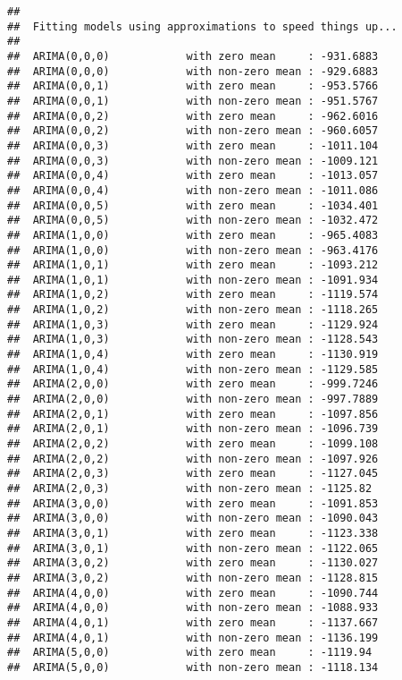 \documentclass[]{article}
\begin{document}
\begin{verbatim}
## 
##  Fitting models using approximations to speed things up...
## 
##  ARIMA(0,0,0)            with zero mean     : -931.6883
##  ARIMA(0,0,0)            with non-zero mean : -929.6883
##  ARIMA(0,0,1)            with zero mean     : -953.5766
##  ARIMA(0,0,1)            with non-zero mean : -951.5767
##  ARIMA(0,0,2)            with zero mean     : -962.6016
##  ARIMA(0,0,2)            with non-zero mean : -960.6057
##  ARIMA(0,0,3)            with zero mean     : -1011.104
##  ARIMA(0,0,3)            with non-zero mean : -1009.121
##  ARIMA(0,0,4)            with zero mean     : -1013.057
##  ARIMA(0,0,4)            with non-zero mean : -1011.086
##  ARIMA(0,0,5)            with zero mean     : -1034.401
##  ARIMA(0,0,5)            with non-zero mean : -1032.472
##  ARIMA(1,0,0)            with zero mean     : -965.4083
##  ARIMA(1,0,0)            with non-zero mean : -963.4176
##  ARIMA(1,0,1)            with zero mean     : -1093.212
##  ARIMA(1,0,1)            with non-zero mean : -1091.934
##  ARIMA(1,0,2)            with zero mean     : -1119.574
##  ARIMA(1,0,2)            with non-zero mean : -1118.265
##  ARIMA(1,0,3)            with zero mean     : -1129.924
##  ARIMA(1,0,3)            with non-zero mean : -1128.543
##  ARIMA(1,0,4)            with zero mean     : -1130.919
##  ARIMA(1,0,4)            with non-zero mean : -1129.585
##  ARIMA(2,0,0)            with zero mean     : -999.7246
##  ARIMA(2,0,0)            with non-zero mean : -997.7889
##  ARIMA(2,0,1)            with zero mean     : -1097.856
##  ARIMA(2,0,1)            with non-zero mean : -1096.739
##  ARIMA(2,0,2)            with zero mean     : -1099.108
##  ARIMA(2,0,2)            with non-zero mean : -1097.926
##  ARIMA(2,0,3)            with zero mean     : -1127.045
##  ARIMA(2,0,3)            with non-zero mean : -1125.82
##  ARIMA(3,0,0)            with zero mean     : -1091.853
##  ARIMA(3,0,0)            with non-zero mean : -1090.043
##  ARIMA(3,0,1)            with zero mean     : -1123.338
##  ARIMA(3,0,1)            with non-zero mean : -1122.065
##  ARIMA(3,0,2)            with zero mean     : -1130.027
##  ARIMA(3,0,2)            with non-zero mean : -1128.815
##  ARIMA(4,0,0)            with zero mean     : -1090.744
##  ARIMA(4,0,0)            with non-zero mean : -1088.933
##  ARIMA(4,0,1)            with zero mean     : -1137.667
##  ARIMA(4,0,1)            with non-zero mean : -1136.199
##  ARIMA(5,0,0)            with zero mean     : -1119.94
##  ARIMA(5,0,0)            with non-zero mean : -1118.134

\end{verbatim}
\end{document}
